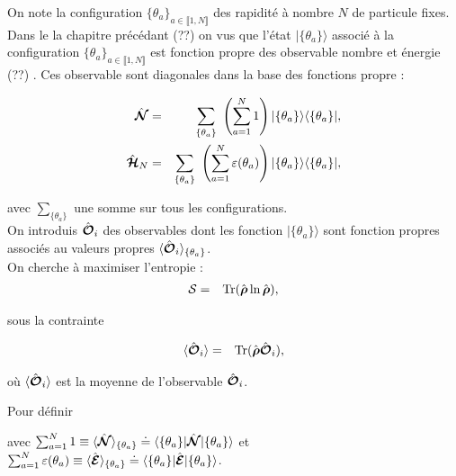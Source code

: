 On note la configuration $\{ \theta_a \}_{a\in \llbracket 1 , N \rrbracket}$ des rapidité à nombre $N$ de particule fixes. Dans le la chapitre précédant (??) on vus que l'état $\vert \{ \theta_a \} \rangle$ associé à la configuration $\{ \theta_a \}_{a\in \llbracket 1 , N \rrbracket}$ est fonction propre des observable nombre et énergie (??) . Ces observable sont diagonales dans la base des fonctions propre :

\begin{eqnarray}
	\operator{\mathcal{N}} & = & \sum_{ \{\theta_a\} }   \left ( \sum_{a = 1}^N  1 \right )  \vert \{ \theta_a\}\rangle	\langle \{ \theta_a \}\vert,\\
	\operator{\mathcal{H}}_N & = & \sum_{\{ \theta_a\}}  \left ( \sum_{a = 1}^N  \varepsilon ( \theta_a ) \right )   \vert \{ \theta_a\}\rangle	\langle \{ \theta_a \}\vert,		
\end{eqnarray}

avec $ \sum_{\{ \theta_a\}}$ une somme sur tous les configurations.\\

On introduis $\hat{\bm{\mathcal{O}}}_i$ des observables dont les fonction  $\vert \{ \theta_a \} \rangle$  sont fonction propres associés au valeurs propres $\langle \hat{\bm{\mathcal{O}}}_i \rangle_{\{\theta_a \}}$.\\

On cherche à maximiser l'entropie :
\begin{eqnarray}
	\mathcal{S} & = & \mathrm{Tr} ( \hat{\bm{\rho}} \ln \hat{\bm{\rho}} ) , 	
\end{eqnarray}

sous la contrainte 

\begin{eqnarray}
	\langle \hat{\bm{\mathcal{O}}}_i \rangle & = & 	\mathrm{Tr} ( \hat{\bm{\rho}} \hat{\bm{\mathcal{O}}}_i ) ,
\end{eqnarray}

où $\langle \hat{\bm{\mathcal{O}}}_i \rangle$ est la moyenne de l'observable $\hat{\bm{\mathcal{O}}}_i$.

Pour définir  



	
	avec $\sum_{a = 1}^N 1 \equiv \langle \hat{\bm{\mathcal{N}}} \rangle_{ \{\theta_a \} }  \doteq  \langle \{ \theta_a \}\vert  \hat{\bm{\mathcal{N}}} \vert\{ \theta_a\}\rangle  $ et $  \sum_{a = 1}^N  \varepsilon ( \theta_a ) \equiv \langle \hat{\bm{\mathcal{E}}} \rangle_{\{\theta_a \}}  \doteq  \langle \{ \theta_a \}\vert  \hat{\bm{ \mathcal{E}}}  \vert\{ \theta_a\}\rangle $.

